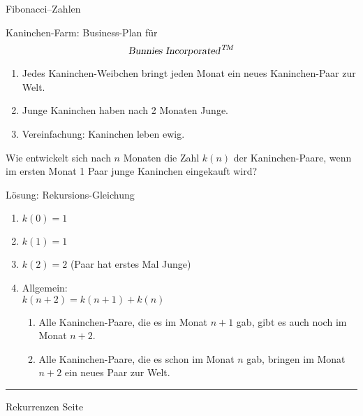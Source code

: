 \documentclass{slides}
\newcounter{mypage}
\begin{document}

\begin{slide}{}
\normalsize

\begin{center}
Fibonacci--Zahlen
\end{center}
\vspace*{0.5cm}

\footnotesize
Kaninchen-Farm: Business-Plan f\"ur 
$$\textsl{Bunnies Incorporated}^{\,T\!M}$$
\begin{enumerate}
\item Jedes Kaninchen-Weibchen bringt jeden Monat ein
      neues Kaninchen-Paar  zur Welt.
\item Junge Kaninchen haben nach 2 Monaten Junge.
\item Vereinfachung: Kaninchen leben ewig. 
\end{enumerate}
Wie entwickelt sich nach $n$ Monaten die Zahl $k(n)$ der Kaninchen-Paare, wenn im ersten Monat
1 Paar junge Kaninchen eingekauft wird?

L\"osung: Rekursions-Gleichung
\begin{enumerate}
\item $k(0) = 1$
\item $k(1) = 1$
\item $k(2) = 2$ (Paar hat erstes Mal Junge)
\item Allgemein: \\[0.3cm]
      \hspace*{1.3cm} $k(n+2) = k(n + 1) + k(n)$ 
      \begin{enumerate}
      \item Alle Kaninchen-Paare, die es im Monat $n + 1$ gab, gibt es auch noch
            im Monat $n + 2$.
      \item Alle Kaninchen-Paare, die es schon im Monat $n$ gab, bringen im Monat
            $n + 2$ ein neues Paar zur Welt.
      \end{enumerate}
\end{enumerate}
\vspace*{\fill}
\tiny \addtocounter{mypage}{1}
\rule{17cm}{1mm}
Rekurrenzen  \hspace*{\fill} Seite 
\end{slide}

\end{document}
